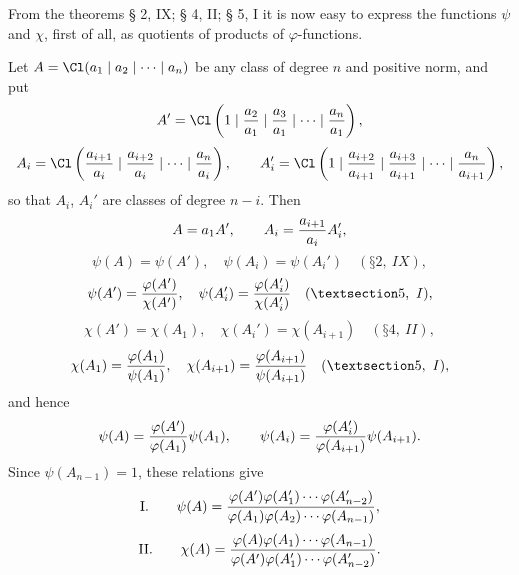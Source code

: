 From the theorems § 2, IX; § 4, II; § 5, I it is now easy to express the functions $\psi$ and $\chi$, first of all, as quotients of products of $\varphi$-functions.

Let $A=\Cl(a_1\mid a_2\mid\cdots\mid a_n)$ be any class of degree $n$ and positive norm, and put
\[
 A'=\Cl\left(1\mid {a_2\over a_1}\mid {a_3\over a_1}\mid\cdots\mid {a_n\over a_1}\right),
\]
\[
 A_i=\Cl\left({a_{i+1}\over a_i}\mid {a_{i+2}\over a_i}\mid\cdots\mid {a_n\over a_i}\right),
\qquad
 A_i'=\Cl\left(1\mid {a_{i+2}\over a_{i+1}}\mid {a_{i+3}\over a_{i+1}}\mid\cdots\mid {a_n\over a_{i+1}}\right),
\]
so that $A_i$, $A_i'$ are classes of degree $n-i$. Then
\[
 A=a_1A',\qquad A_i={a_{i+1}\over a_i}A_i',
\]
\[
 \psi(A)=\psi(A'),\quad \psi(A_i)=\psi(A_i')\quad (§ 2,\ IX),
\]
\[
 \psi(A')={\varphi(A')\over\chi(A')},\quad
 \psi(A_i')={\varphi(A_i')\over\chi(A_i')}\quad (§ 5,\ I),
\]
\[
 \chi(A')=\chi(A_1),\quad \chi(A_i')=\chi(A_{i+1})\quad (§ 4,\ II),
\]
\[
 \chi(A_1)={\varphi(A_1)\over\psi(A_1)},\quad
 \chi(A_{i+1})={\varphi(A_{i+1})\over\psi(A_{i+1})}\quad (§ 5,\ I),
\]
and hence
\[
 \psi(A)={\varphi(A')\over\varphi(A_1)}\psi(A_1),
 \qquad
 \psi(A_i)={\varphi(A_i')\over\varphi(A_{i+1})}\psi(A_{i+1}).
\]
Since $\psi(A_{n-1})=1$, these relations give
\[
\text{I.}\qquad
 \psi(A)={\varphi(A')\varphi(A_1')\cdots\varphi(A_{n-2}')
 \over
 \varphi(A_1)\varphi(A_2)\cdots\varphi(A_{n-1})},
\]
\[
\text{II.}\qquad
 \chi(A)={\varphi(A)\varphi(A_1)\cdots\varphi(A_{n-1})
 \over
 \varphi(A')\varphi(A_1')\cdots\varphi(A_{n-2}')}.
\]

